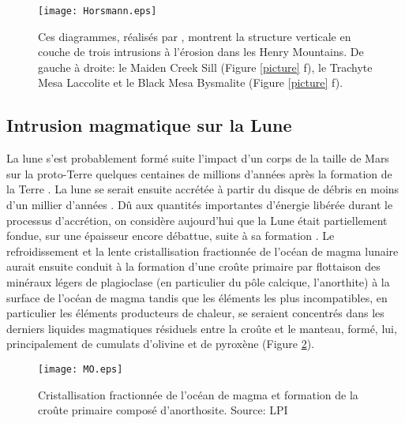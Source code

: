 \begin{figure}[htpb]
  \begin{center}
    \graphicspath{ {/Users/thorey/Documents/These/Manuscript/Figure/Chapter1/} }
    \texttt{[image: Horsmann.eps]}
    \caption{Ces  diagrammes,  réalisés  par  \citet{Horsman:2009gea},
      montrent la structure verticale en  couche de trois intrusions à
      l'érosion  dans les  Henry  Mountains. De  gauche  à droite:  le
      Maiden  Creek Sill  (Figure \ref{picture}  f), le  Trachyte Mesa
      Laccolite et le Black Mesa Bysmalite (Figure \ref{picture} f).}
    \label{Horsmann}
  \end{center}
\end{figure}

\subsection{Intrusion magmatique sur la Lune}
\label{sec:moon}

La  lune s'est  probablement formé  suite  l'impact d'un  corps de  la
taille  de Mars  sur  la proto-Terre  quelques  centaines de  millions
d'années      après      la       formation      de      la      Terre
\citep{Cameron:1991vu,Canup:2001eb,Canup:2012cd}.   La lune  se serait
ensuite accrétée  à partir du disque  de débris en moins  d'un millier
d'années  \citep{Mizutani:1972hc}.    Dû  aux   quantités  importantes
d'énergie  libérée  durant  le  processus  d'accrétion,  on  considère
aujourd'hui que la Lune était  partiellement fondue, sur une épaisseur
encore débattue, suite à sa formation \citep{ElkinsTanton:2011ce}.  Le
refroidissement et la lente  cristallisation fractionnée de l'océan de
magma  lunaire aurait  ensuite  conduit à  la  formation d'une  croûte
primaire  par  flottaison  des  minéraux  légers  de  plagioclase  (en
particulier du pôle calcique, l'anorthite)  à la surface de l'océan de
magma tandis que  les éléments les plus  incompatibles, en particulier
les éléments producteurs  de chaleur, se seraient  concentrés dans les
derniers liquides magmatiques résiduels entre la croûte et le manteau,
formé,  lui,  principalement  de  cumulats d'olivine  et  de  pyroxène
(Figure \ref{MO}).

\begin{figure}[htpb]
  \begin{center}
    \graphicspath{ {/Users/thorey/Documents/These/Manuscript/Figure/Chapter1/} }
    \texttt{[image: MO.eps]}
    \caption{Cristallisation  fractionnée  de   l'océan  de  magma  et
      formation de  la croûte primaire composé  d'anorthosite. Source:
      LPI}
    \label{MO}
  \end{center}
\end{figure}

